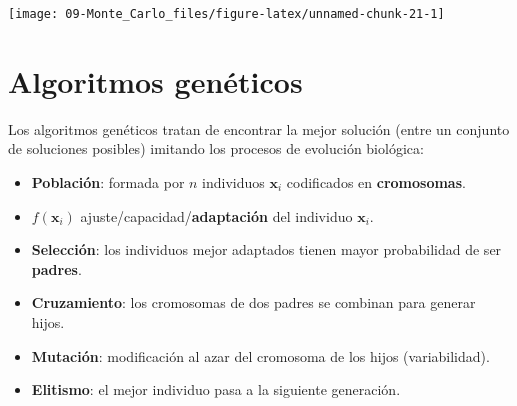 \documentclass[
]{book}
\newenvironment{Shaded}{\begin{snugshade}}{\end{snugshade}}
\newcommand{\ControlFlowTok}[1]{\textcolor[rgb]{0.13,0.29,0.53}{\textbf{#1}}}
\newcommand{\DataTypeTok}[1]{\textcolor[rgb]{0.13,0.29,0.53}{#1}}
\newcommand{\DecValTok}[1]{\textcolor[rgb]{0.00,0.00,0.81}{#1}}
\newcommand{\KeywordTok}[1]{\textcolor[rgb]{0.13,0.29,0.53}{\textbf{#1}}}
\newcommand{\NormalTok}[1]{#1}
\newcommand{\OperatorTok}[1]{\textcolor[rgb]{0.81,0.36,0.00}{\textbf{#1}}}
\newcommand{\StringTok}[1]{\textcolor[rgb]{0.31,0.60,0.02}{#1}}
\theoremstyle{break}
\theoremstyle{definition}
\theoremstyle{definition}
\theoremstyle{definition}
\theoremstyle{remark}
\begin{document}
\begin{Shaded}
\end{Shaded}

\begin{center}\texttt{[image: 09-Monte\_Carlo\_files/figure-latex/unnamed-chunk-21-1]} \end{center}

\hypertarget{algoritmos-genuxe9ticos}{%
\section{Algoritmos genéticos}\label{algoritmos-genuxe9ticos}}

Los algoritmos genéticos tratan de encontrar la mejor solución
(entre un conjunto de soluciones posibles) imitando los procesos de
evolución biológica:

\begin{itemize}
\item
  \textbf{Población}: formada por \(n\) individuos \(\mathbf{x}_i\)
  codificados en \textbf{cromosomas}.
\item
  \(f(\mathbf{x}_i)\) ajuste/capacidad/\textbf{adaptación} del
  individuo \(\mathbf{x}_i\).
\item
  \textbf{Selección}: los individuos mejor adaptados tienen mayor
  probabilidad de ser \textbf{padres}.
\item
  \textbf{Cruzamiento}: los cromosomas de dos padres se combinan para
  generar hijos.
\item
  \textbf{Mutación}: modificación al azar del cromosoma de los
  hijos (variabilidad).
\item
  \textbf{Elitismo}: el mejor individuo pasa a la siguiente generación.
\end{itemize}
\end{document}
